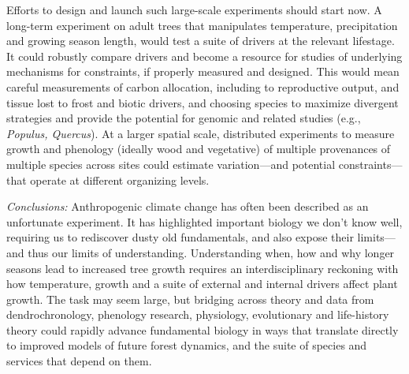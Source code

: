\documentclass[11pt]{article}
\begin{document}
Efforts to design and launch such large-scale experiments should start now. A long-term experiment on adult trees that manipulates temperature, precipitation and growing season length, would test a suite of drivers at the relevant lifestage. It could robustly compare drivers and become a resource for studies of underlying mechanisms for constraints, if properly measured and designed. This would mean careful measurements of carbon allocation, including to reproductive output, and tissue lost to frost and biotic drivers, and choosing species to maximize divergent strategies and provide the potential for genomic and related studies (e.g., \emph{Populus, Quercus}).  At a larger spatial scale, distributed experiments to measure growth and phenology (ideally wood and vegetative) of multiple provenances of multiple species across sites could estimate variation---and potential constraints---that operate at different organizing levels. 

\emph{Conclusions:} %
Anthropogenic climate change has often been described as an unfortunate experiment. It has highlighted important biology we don't know well, requiring us to rediscover dusty old fundamentals, and also expose their limits---and thus our limits of understanding. Understanding when, how and why longer seasons lead to increased tree growth requires an interdisciplinary reckoning with how temperature, growth and a suite of external and internal drivers affect plant growth. The task may seem large, but bridging across theory and data from dendrochronology, phenology research, physiology, evolutionary and life-history theory could rapidly advance fundamental biology in ways that translate directly to improved models of future forest dynamics, and the suite of species and services that depend on them. %

\end{document}
